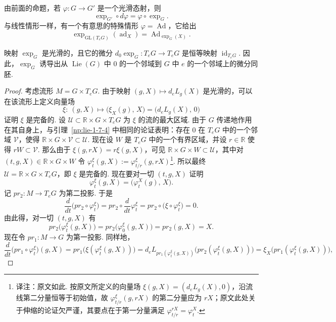 \begin{remark*}
由前面的命题，若 $\varphi:G\longrightarrow G'$ 是一个光滑态射，则
\[
\exp_{G'}\circ d\varphi=\varphi\circ\exp_{G}.
\]
与线性情形一样，有一个有意思的特殊情形 $\varphi=\operatorname{Ad}$，它给出
\[
\exp_{\mathrm{GL}(T_{e}G)}(\operatorname{ad}_{X})=\operatorname{Ad}_{\exp_{G}(X)}.
\]
\end{remark*}

\begin{proposition}\label{prop:lie-1-7-8}
映射 $\exp_{G}$ 是光滑的，且它的微分 $d_{0}\exp_{G}:T_{e}G\longrightarrow T_{e}G$ 是恒等映射 $\operatorname{id}_{T_{e}G}$. 因此，$\exp_{G}$ 诱导出从 $\operatorname{Lie}(G)$ 中 $0$ 的一个邻域到 $G$ 中 $e$ 的一个邻域上的微分同胚.
\end{proposition}

\begin{proof}
考虑流形 $M=G\times T_{e}G$. 由于映射 $(g,X)\mapsto d_{e}L_{g}(X)$ 是光滑的，可以在该流形上定义向量场
\[
\xi:\ (g,X)\mapsto\bigl(\xi_{X}(g),\,X\bigr)=\bigl(d_{e}L_{g}(X),\,0\bigr)
\]
证明 $\xi$ 是完备的. 设 $\mathcal U\subset\mathbb R\times G\times T_{e}G$ 为 $\xi$ 的流的最大区域. 由于 $G$ 传递地作用在其自身上，与引理~\ref{np:lie-1-7-4} 中相同的论证表明：存在 $0$ 在 $T_{e}G$ 中的一个邻域 $\mathcal V$，使得 $\mathbb R\times G\times\mathcal V\subset\mathcal U$. 现在设 $W$ 是 $T_{e}G$ 中的一个有界区域，并设 $r\in\mathbb R$ 使得 $rW\subset\mathcal V$. 那么由于 $\xi(g,rX)=r\xi(g,X)$，可见 $\mathbb R\times G\times W\subset\mathcal U$，其中对 $(t,g,X)\in\mathbb R\times G\times W$ 令 $\varphi^{\xi}_{t}(g,X):=\varphi^{\xi}_{t/r}(g,rX)$\footnote{译注：原文如此. 按原文所定义的向量场 $\xi(g,X)=(d_{e}L_{g}(X),0)$，沿流线第二分量恒等于初始值，故 $\varphi^{\xi}_{t/r}(g,rX)$ 的第二分量应为 $rX$；原文此处关于伸缩的论证欠严谨，其要点在于第一分量满足 $\varphi^{rX}_{t/r}=\varphi^{X}_{t}$.}. 所以最终 $\mathcal U=\mathbb R\times G\times T_{e}G$，即 $\xi$ 是完备的.
现在要对一切 $(t,g,X)$ 证明
\[
\varphi^{\xi}_{t}(g,X)=\bigl(\varphi^{X}_{t}(g),\,X\bigr).
\]
记 $pr_{2}:M\longrightarrow T_{e}G$ 为第二投影. 于是
\[
\frac{d}{dt}\bigl(pr_{2}\circ\varphi^{\xi}_{t}\bigr)=pr_{2}\circ\frac{d}{dt}\varphi^{\xi}_{t}=pr_{2}\circ\bigl(\xi\circ\varphi^{\xi}_{t}\bigr)=0.
\]
由此得，对一切 $(t,g,X)$ 有
\[
pr_{2}\bigl(\varphi^{\xi}_{t}(g,X)\bigr)=pr_{2}\bigl(\varphi^{\xi}_{0}(g,X)\bigr)=pr_{2}(g,X)=X.
\]
现在令 $pr_{1}:M\longrightarrow G$ 为第一投影. 同样地，
\[
\frac{d}{dt}\bigl(pr_{1}\circ\varphi^{\xi}_{t}\bigr)(g,X)=pr_{1}\bigl(\xi(\varphi^{\xi}_{t}(g,X))\bigr)=d_{e}L_{pr_{1}(\varphi^{\xi}_{t}(g,X))}\bigl(pr_{2}(\varphi^{\xi}_{t}(g,X))\bigr)=\xi_{X}\bigl(pr_{1}(\varphi^{\xi}_{t}(g,X))\bigr),
\]
\end{proof}
